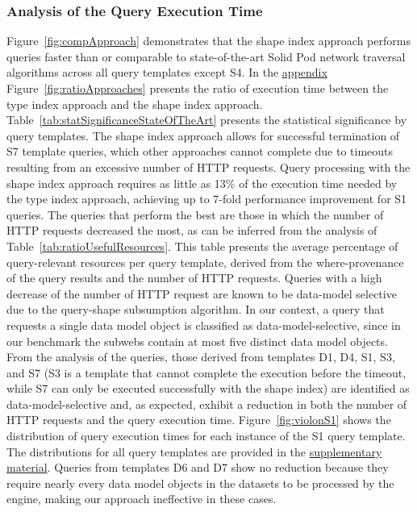 \subsubsection{Analysis of the Query Execution Time}
Figure~\ref{fig:compApproach} demonstrates that the shape index approach performs queries faster than or comparable to state-of-the-art Solid Pod network traversal algorithms across all query templates except S4.
In the \hyperref[sec:appendix]{appendix} Figure~\ref{fig:ratioApproaches} presents the ratio of execution time between the type index approach and the shape index approach.
Table~\ref{tab:statSignificanceStateOfTheArt} presents the statistical significance by query templates.
The shape index approach allows for successful termination of S7 template queries, which other approaches cannot complete due to timeouts resulting from an excessive number of \ac{HTTP} requests.
Query processing with the shape index approach requires as little as 13\% of the execution time needed by the type index approach, achieving up to 7-fold performance improvement for S1 queries.
The queries that perform the best are those in which the number of \ac{HTTP} requests decreased the most, as can be inferred from the analysis of Table~\ref{tab:ratioUsefulResources}.
This table presents the average percentage of query-relevant resources per query template, derived from the where-provenance~\cite{buneman2001and} of the query results and the number of \ac{HTTP} requests.
Queries with a high decrease of the number of \ac{HTTP} request are known to be data-model selective due to the query-shape subsumption algorithm.
In our context, a query that requests a single data model object is classified as data-model-selective, since in our benchmark the subwebs contain at most five distinct data model objects.
From the analysis of the queries, those derived from templates D1, D4, S1, S3, and S7 (S3 is a template that cannot complete the execution before the timeout, while S7 can only be executed successfully with the shape index) are identified as data-model-selective and, as expected, exhibit a reduction in both the number of \ac{HTTP} requests and the query execution time.
Figure~\ref{fig:violonS1} shows the distribution of query execution times for each instance of the S1 query template.
The distributions for all query templates are provided in the \hyperref[sec:supplementalMaterial]{supplementary material}.
Queries from templates D6 and D7 show no reduction because they require nearly every data model objects in the datasets to be processed by the engine, making our approach ineffective in these cases.
